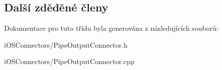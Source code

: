 \subsection*{Další zděděné členy}


Dokumentace pro tuto třídu byla generována z následujících souborů\-:\begin{DoxyCompactItemize}
\item 
i\-O\-S\-Connectors/Pipe\-Output\-Connector.\-h\item 
i\-O\-S\-Connectors/Pipe\-Output\-Connector.\-cpp\end{DoxyCompactItemize}
